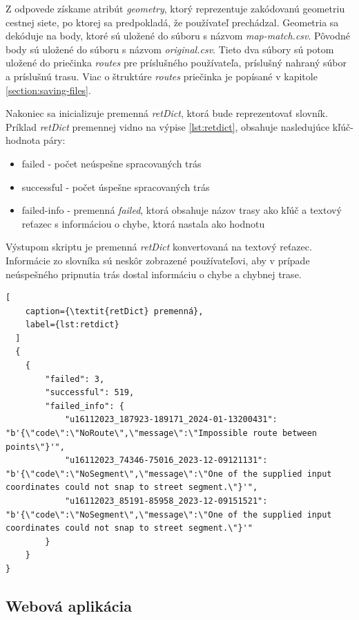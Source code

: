 Z odpovede získame atribút \textit{geometry}, ktorý reprezentuje zakódovanú geometriu cestnej siete, po ktorej sa predpokladá, že používateľ prechádzal. Geometria sa dekóduje na body, ktoré sú uložené do súboru s názvom \textit{map-match.csv}. Pôvodné body sú uložené do súboru s názvom \textit{original.csv}. Tieto dva súbory sú potom uložené do priečinka \textit{routes} pre príslušného používateľa, príslušný nahraný súbor a príslušnú trasu. Viac o štruktúre \textit{routes} priečinka je popísané v kapitole \ref{section:saving-files}.

Nakoniec sa inicializuje premenná \textit{retDict}, ktorá bude reprezentovať slovník. Príklad \textit{retDict} premennej vidno na výpise \ref{lst:retdict}, obsahuje nasledujúce kľúč-hodnota páry:
\begin{itemize}
  \item failed -  počet neúspešne spracovaných trás
  \item successful - počet úspešne spracovaných trás
  \item failed-info - premenná \textit{failed}, ktorá obsahuje názov trasy ako kľúč a textový reťazec s informáciou o chybe, ktorá nastala ako hodnotu
\end{itemize}

Výstupom skriptu je premenná \textit{retDict} konvertovaná na textový reťazec. Informácie zo slovníka sú neskôr zobrazené používateľovi, aby v prípade neúspešného pripnutia trás dostal informáciu o chybe a chybnej trase.




\begin{lstlisting}[
    caption={\textit{retDict} premenná},
    label={lst:retdict}
  ]
  {
    {
        "failed": 3,
        "successful": 519,
        "failed_info": {
            "u16112023_187923-189171_2024-01-13200431": "b'{\"code\":\"NoRoute\",\"message\":\"Impossible route between points\"}'",
            "u16112023_74346-75016_2023-12-09121131": "b'{\"code\":\"NoSegment\",\"message\":\"One of the supplied input coordinates could not snap to street segment.\"}'",
            "u16112023_85191-85958_2023-12-09151521": "b'{\"code\":\"NoSegment\",\"message\":\"One of the supplied input coordinates could not snap to street segment.\"}'"
        }
    }
}
  \end{lstlisting}


\subsection{Webová aplikácia}
